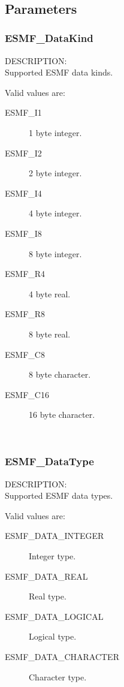 \mbox{}\hrulefill\

\subsection{Parameters}

\subsubsection{ESMF\_DataKind}

{\sf DESCRIPTION:\\}
Supported ESMF data kinds.

Valid values are:
\begin{description}
\item [ESMF\_I1]
      1 byte integer.
\item [ESMF\_I2]
      2 byte integer.
\item [ESMF\_I4]
      4 byte integer.
\item [ESMF\_I8]
      8 byte integer.
\item [ESMF\_R4]
      4 byte real.
\item [ESMF\_R8]
      8 byte real.
\item [ESMF\_C8]
      8 byte character.
\item [ESMF\_C16]
      16 byte character.
\end{description}

\mbox{}\hrulefill\

\subsubsection{ESMF\_DataType}

{\sf DESCRIPTION:\\}
Supported ESMF data types.

Valid values are:
\begin{description}
\item [ESMF\_DATA\_INTEGER]
      Integer type.
\item [ESMF\_DATA\_REAL]
      Real type.
\item [ESMF\_DATA\_LOGICAL]
      Logical type.
\item [ESMF\_DATA\_CHARACTER]
      Character type.
\end{description}

\mbox{}\hrulefill\









